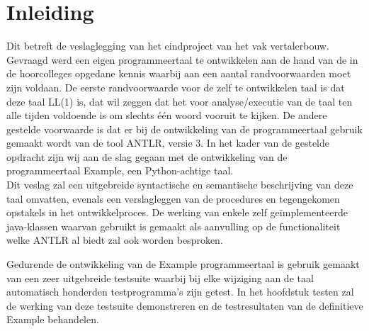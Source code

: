 \chapter{Inleiding}
Dit betreft de veslaglegging van het eindproject van het vak vertalerbouw. Gevraagd werd een eigen programmeertaal te ontwikkelen aan de hand van de in de hoorcolleges opgedane kennis waarbij aan een aantal randvoorwaarden moet zijn voldaan. De eerste randvoorwaarde voor de zelf te ontwikkelen taal is dat deze taal LL(1) is, dat wil zeggen dat het voor analyse/executie van de taal ten alle tijden voldoende is om slechts \'{e}\'{e}n woord vooruit te kijken. De andere gestelde voorwaarde is dat er bij de ontwikkeling van de programmeertaal gebruik gemaakt wordt van de tool ANTLR, versie 3. In het kader van de gestelde opdracht zijn wij aan de slag gegaan met de ontwikkeling van de programmeertaal Example, een Python-achtige taal.\\

Dit veslag zal een uitgebreide syntactische en semantische beschrijving van deze taal omvatten, evenals een verslagleggen van de procedures en tegengekomen opstakels in het ontwikkelproces. De werking van enkele zelf ge\"{i}mplementeerde java-klassen waarvan gebruikt is gemaakt als aanvulling op de functionaliteit welke ANTLR al biedt zal ook worden besproken. 

Gedurende de ontwikkeling van de Example programmeertaal is gebruik gemaakt van een zeer uitgebreide testsuite waarbij bij elke wijziging aan de taal automatisch honderden testprogramma's zijn getest. In het hoofdstuk testen zal de werking van deze testsuite demonstreren en de testresultaten van de definitieve Example behandelen.
